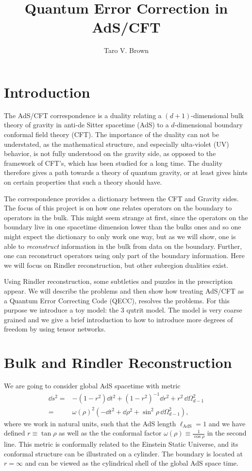\documentclass[letter,12pt]{article}
\title{Quantum Error Correction in AdS/CFT}
\author[a]{Taro V. Brown}
\affiliation[a]{Department of Physics, UC Davis, One Shields Avenue, Davis, CA 95616, USA }
\begin{document}
 
\maketitle
\flushbottom
\newpage
\section{Introduction}
The AdS/CFT correspondence is a duality relating a
$(d+1)$-dimensional bulk theory of gravity in anti-de Sitter spacetime (AdS) to a $d$-dimensional boundary conformal field theory (CFT). The importance of the duality can not be understated, as the mathematical structure, and especially ulta-violet (UV) behavior, is not fully understood on the gravity side, as opposed to the framework of CFT's, which has been studied for a long time. The duality therefore gives a path towards a theory of quantum gravity, or at least gives hints on certain properties that such a theory should have.

The correspondence provides a dictionary between the CFT and Gravity sides. The focus of this project is on how one relates operators on the boundary to operators in the bulk. This might seem strange at first, since the operators on the boundary live in one spacetime dimension lower than the bulks ones and so one might expect the dictionary to only work one way, but as we will show, one is able to \textit{reconstruct} information in the bulk from data on the boundary. Further, one can reconstruct operators using only part of the boundary information. Here we will focus on Rindler reconstruction, but other subregion dualities exist. 

Using Rindler reconstruction, some subtleties and puzzles in the prescription appear. We will describe the problems and then show how treating AdS/CFT as a Quantum Error Correcting Code (QECC), resolves the problems. For this purpose we introduce a toy model: the 3 qutrit model. The model is very coarse grained and we give a brief introduction to how to introduce more degrees of freedom by using tensor networks.
\section{Bulk and Rindler Reconstruction \label{sec:1}}
We are going to consider global AdS spacetime with metric
\begin{equation}
	\begin{aligned}
		\dd s^2=&-\left(1-r^2\right)\dd t^2+\left(1-r^2\right)^{-1}\dd r^2+r^2\,\dd\Omega_{d-1}^2
		\\
		=&\omega(\rho)^2\left(-\dd t^2+\dd \rho^2+\sin^2\rho\,\dd\Omega_{d-1}^2 \right),
	\end{aligned}
\end{equation}
where we work in natural units, such that the AdS length $\ell_{\text{AdS}}=1$ and we have defined $r\equiv \tan\rho $ as well as the the conformal factor $\omega(\rho)\equiv \frac{1}{\cos\rho}$ in the second line. This metric is conformally related to the Einstein Static Universe, and its conformal structure can be illustrated on a cylinder. The boundary is located at $r=\infty$ and can be viewed as the cylindrical shell of the global AdS space time.
\end{document}
